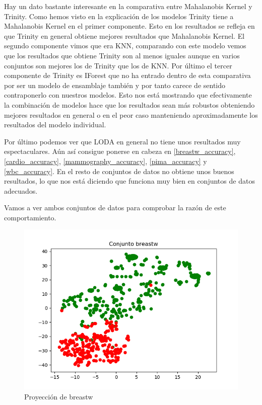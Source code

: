 Hay un dato bastante interesante en la comparativa entre Mahalanobis Kernel y Trinity. Como hemos visto en la explicación de los modelos Trinity tiene a Mahalanobis Kernel en el primer componente. Esto en los resultados se refleja en que Trinity en general obtiene mejores resultados que Mahalanobis Kernel. El segundo componente vimos que era KNN, comparando con este modelo vemos que los resultados que obtiene Trinity son al menos iguales aunque en varios conjuntos son mejores los de Trinity que los de KNN. Por último el tercer componente de Trinity es IForest que no ha entrado dentro de esta comparativa por ser un modelo de ensamblaje también y por tanto carece de sentido contraponerlo con nuestros modelos. Esto nos está mostrando que efectivamente la combinación de modelos hace que los resultados sean más robustos obteniendo mejores resultados en general o en el peor caso manteniendo aproximadamente los resultados del modelo individual.

Por último podemos ver que LODA en general no tiene unos resultados muy espectaculares. Aún así consigue ponerse en cabeza en \ref{breastw_accuracy}, \ref{cardio_accuracy}, \ref{mammography_accuracy}, \ref{pima_accuracy} y \ref{wbc_accuracy}. En el resto de conjuntos de datos no obtiene unos buenos resultados, lo que nos está diciendo que funciona muy bien en conjuntos de datos adecuados.

Vamos a ver ambos conjuntos de datos para comprobar la razón de este comportamiento.

\begin{figure}[H]
	\centering
	\includegraphics[scale=0.7]{imagenes/breastw}
	\caption{Proyección de breastw}
	\label{breastw}
\end{figure}

